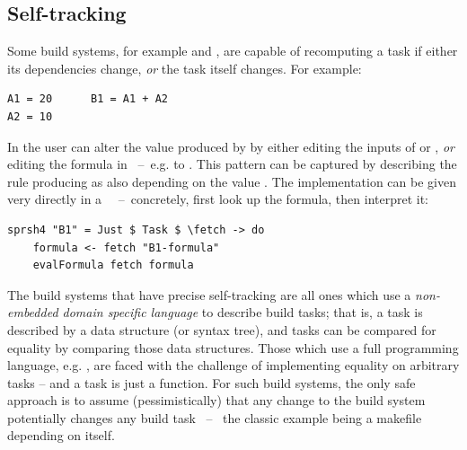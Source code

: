 
\subsection{Self-tracking}\label{sec-tracking-aspects}

Some build systems, for example \Excel and \Ninja, are capable of recomputing a
task if either its dependencies change, \emph{or} the task itself changes. For
example:

\vspace{0.5mm}
\begin{verbatim}
A1 = 20      B1 = A1 + A2
A2 = 10
\end{verbatim}
\vspace{0.5mm}

\noindent
In \Excel the user can alter the value produced by  by either editing
the inputs of  or , \emph{or} editing the formula in
~--~e.g. to . This pattern can be captured by describing
the rule producing  as also depending on the value .
The implementation can be given very directly in a
~~--~concretely, first look up the formula, then interpret
it:

\vspace{1mm}
\begin{verbatim}
sprsh4 "B1" = Just $ Task $ \fetch -> do
    formula <- fetch "B1-formula"
    evalFormula fetch formula
\end{verbatim}
\vspace{1mm}

\noindent
The build systems that have precise self-tracking are all ones which
use a \emph{non-embedded domain specific language} to describe build
tasks; that is, a task is described by a data structure (or syntax
tree), and tasks can be compared for equality by comparing those data
structures. Those which use a full programming language, e.g. \Shake,
are faced with the challenge of implementing equality on arbitrary
tasks -- and a task is just a function.  For such build systems, the
only safe approach is to assume (pessimistically) that any
change to the build system potentially changes any build task ~--~ the
classic example being a makefile depending on itself.


